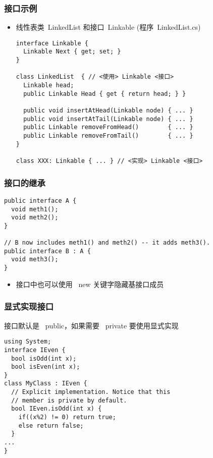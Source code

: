 \begin{frame}[fragile]
\frametitle{接口示例}

\begin{itemize}
\item 线性表类~LinkedList 和接口~Linkable (程序~LinkedList.cs)

\begin{lstlisting}[escapeinside=<>]
interface Linkable {
  Linkable Next { get; set; }  
}

class LinkedList  { // <使用> Linkable <接口>
  Linkable head;
  public Linkable Head { get { return head; } }

  public void insertAtHead(Linkable node) { ... }
  public void insertAtTail(Linkable node) { ... }
  public Linkable removeFromHead()        { ... }
  public Linkable removeFromTail()        { ... }
}

class XXX: Linkable { ... } // <实现> Linkable <接口>
\end{lstlisting}
\end{itemize}

\end{frame}

\begin{frame}[fragile]
\frametitle{接口的继承}
\begin{lstlisting}
public interface A {
  void meth1();
  void meth2();
}

// B now includes meth1() and meth2() -- it adds meth3().
public interface B : A {
  void meth3();
}

\end{lstlisting}
\begin{itemize}
\item 接口中也可以使用 ~new 关键字隐藏基接口成员
\end{itemize}
\end{frame}

\begin{frame}[fragile]
\frametitle{显式实现接口}
 接口默认是~ public，如果需要 ~private 要使用显式实现
\begin{lstlisting}
using System;
interface IEven {
  bool isOdd(int x);
  bool isEven(int x);
}
class MyClass : IEven {
  // Explicit implementation. Notice that this
  // member is private by default.
  bool IEven.isOdd(int x) {
    if((x%2) != 0) return true;
    else return false;
  }
...
}
\end{lstlisting}

\end{frame}

